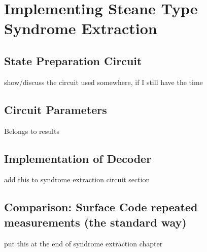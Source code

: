 \chapter{Implementing Steane Type Syndrome Extraction}



\section{State Preparation Circuit}
show/discuss the circuit used somewhere, if I still have the time

\section{Circuit Parameters}
Belongs to results

\section{Implementation of Decoder}

add this to syndrome extraction circuit section 


\section{Comparison: Surface Code repeated measurements (the standard way)} %

put this at the end of syndrome extraction chapter